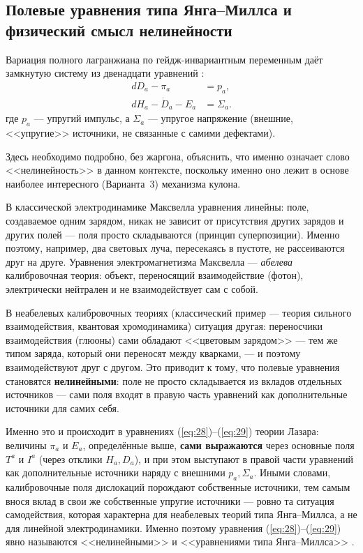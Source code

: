 \documentclass[12pt,a4paper]{article}
\begin{document}
\subsection{Полевые уравнения типа Янга--Миллса и физический смысл нелинейности}
\label{sec:nonlinearity-explained}

Вариация полного лагранжиана по гейдж-инвариантным переменным даёт
замкнутую систему из двенадцати уравнений \cite{Lazar2010}:
\begin{align}
dD_a - \pi_a &= p_a, \label{eq:28}\\
dH_a - \dot D_a - E_a &= \Sigma_a. \label{eq:29}
\end{align}
где $p_a$ --- упругий импульс, а $\Sigma_a$ --- упругое напряжение
(внешние, <<упругие>> источники, не связанные с самими дефектами).

Здесь необходимо подробно, без жаргона, объяснить, что именно означает
слово <<нелинейность>> в данном контексте, поскольку именно оно лежит
в основе наиболее интересного (Варианта~3) механизма кулона.

В классической электродинамике Максвелла уравнения линейны: поле,
создаваемое одним зарядом, никак не зависит от присутствия других
зарядов и других полей --- поля просто складываются (принцип
суперпозиции). Именно поэтому, например, два световых луча,
пересекаясь в пустоте, не рассеиваются друг на друге. Уравнения
электромагнетизма Максвелла --- \emph{абелева} калибровочная теория:
объект, переносящий взаимодействие (фотон), электрически нейтрален и
не взаимодействует сам с собой.

В неабелевых калибровочных теориях (классический пример --- теория
сильного взаимодействия, квантовая хромодинамика) ситуация другая:
переносчики взаимодействия (глюоны) сами обладают <<цветовым
зарядом>> --- тем же типом заряда, который они переносят между
кварками, --- и поэтому взаимодействуют друг с другом. Это приводит к
тому, что полевые уравнения становятся \textbf{нелинейными}: поле не
просто складывается из вкладов отдельных источников --- сами поля
входят в правую часть уравнений как дополнительные источники для
самих себя.

Именно это и происходит в уравнениях (\ref{eq:28})--(\ref{eq:29})
теории Лазара: величины $\pi_a$ и $E_a$, определённые выше,
\textbf{сами выражаются} через основные поля $T^a$ и $I^a$ (через
отклики $H_a,D_a$), и при этом выступают в правой части уравнений как
дополнительные источники наряду с внешними $p_a,\Sigma_a$. Иными
словами, калибровочные поля дислокаций порождают собственные
источники, тем самым внося вклад в свои же собственные упругие
источники \cite{Lazar2010} --- ровно та ситуация самодействия, которая
характерна для неабелевых теорий типа Янга--Миллса, а не для линейной
электродинамики. Именно поэтому уравнения (\ref{eq:28})--(\ref{eq:29})
явно называются <<нелинейными>> и <<уравнениями типа
Янга--Миллса>> \cite{Lazar2010}.
\end{document}
